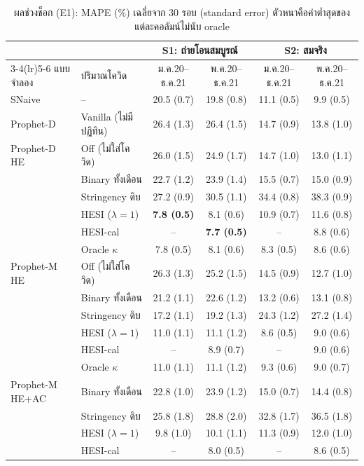 \documentclass{article}
\theoremstyle{definition}
\begin{document}
\begin{table}[!tb]
\centering
\caption{ผลช่วงช็อก (E1): MAPE (\%) เฉลี่ยจาก 30 รอบ (standard error) ตัวหนาคือค่าต่ำสุดของแต่ละคอลัมน์ไม่นับ oracle}
\label{tab:e1}
\footnotesize
\begin{tabular}{llcccc}
\toprule
 & & \multicolumn{2}{c}{S1: ถ่ายโอนสมบูรณ์} & \multicolumn{2}{c}{S2: สมจริง} \\
\cmidrule(lr){3-4}\cmidrule(lr){5-6}
แบบจำลอง & ปริมาณโควิด & ม.ค.20--ธ.ค.21 & พ.ค.20--ธ.ค.21 & ม.ค.20--ธ.ค.21 & พ.ค.20--ธ.ค.21 \\
\midrule
SNaive & -- & 20.5 (0.7) & 19.8 (0.8) & 11.1 (0.5) & 9.9 (0.5) \\
\midrule
Prophet-D & Vanilla (ไม่มีปฏิทิน) & 26.4 (1.3) & 26.4 (1.5) & 14.7 (0.9) & 13.8 (1.0) \\
\midrule
Prophet-D HE & Off (ไม่ใส่โควิด) & 26.0 (1.5) & 24.9 (1.7) & 14.7 (1.0) & 13.0 (1.1) \\
 & Binary ทั้งเดือน & 22.7 (1.2) & 23.9 (1.4) & 15.5 (0.7) & 15.0 (0.9) \\
 & Stringency ดิบ & 27.2 (0.9) & 30.5 (1.1) & 34.4 (0.8) & 38.3 (0.9) \\
 & HESI ($\lambda{=}1$) & \textbf{7.8 (0.5)} & 8.1 (0.6) & 10.9 (0.7) & 11.6 (0.8) \\
 & HESI-cal & -- & \textbf{7.7 (0.5)} & -- & 8.8 (0.6) \\
 & Oracle $\kappa$ & 7.8 (0.5) & 8.1 (0.6) & 8.3 (0.5) & 8.6 (0.6) \\
\midrule
Prophet-M HE & Off (ไม่ใส่โควิด) & 26.3 (1.3) & 25.2 (1.5) & 14.5 (0.9) & 12.7 (1.0) \\
 & Binary ทั้งเดือน & 21.2 (1.1) & 22.6 (1.2) & 13.2 (0.6) & 13.1 (0.8) \\
 & Stringency ดิบ & 17.2 (1.1) & 19.2 (1.3) & 24.3 (1.2) & 27.2 (1.4) \\
 & HESI ($\lambda{=}1$) & 11.0 (1.1) & 11.1 (1.2) & 8.6 (0.5) & 9.0 (0.6) \\
 & HESI-cal & -- & 8.9 (0.7) & -- & 9.0 (0.6) \\
 & Oracle $\kappa$ & 11.0 (1.1) & 11.1 (1.2) & 9.3 (0.6) & 9.0 (0.7) \\
\midrule
Prophet-M HE+AC & Binary ทั้งเดือน & 22.8 (1.0) & 23.9 (1.2) & 15.0 (0.7) & 14.4 (0.8) \\
 & Stringency ดิบ & 25.8 (1.8) & 28.8 (2.0) & 32.8 (1.7) & 36.5 (1.8) \\
 & HESI ($\lambda{=}1$) & 9.8 (1.0) & 10.1 (1.1) & 11.3 (0.9) & 12.0 (1.0) \\
 & HESI-cal & -- & 8.0 (0.5) & -- & 8.6 (0.5) \\

\end{tabular}
\end{table}
\end{document}
